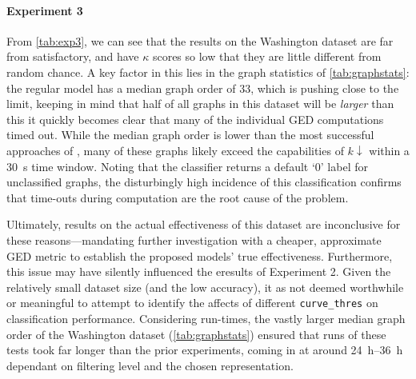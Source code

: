 \documentclass{mpaper}
\begin{document}
\paragraph{Experiment 3}
From \cref{tab:exp3}, we can see that the results on the Washington dataset are far from satisfactory, and have $\kappa$ scores so low that they are little different from random chance.
A key factor in this lies in the graph statistics of \cref{tab:graphstats}: the regular model has a median graph order of 33, which is pushing close to the limit, keeping in mind that half of all graphs in this dataset will be \emph{larger} than this it quickly becomes clear that many of the individual GED computations timed out.
While the median graph order is lower than the most successful approaches of \citeauthor{Graphs-Handwriting}, many of these graphs likely exceed the capabilities of $k\downarrow$ within a \SI{30}{\second} time window.
Noting that the classifier returns a default `0' label for unclassified graphs, the disturbingly high incidence of this classification confirms that time-outs during computation are the root cause of the problem.

Ultimately, results on the actual effectiveness of this dataset are inconclusive for these reasons---mandating further investigation with a cheaper, approximate GED metric to establish the proposed models' true effectiveness.
Furthermore, this issue may have silently influenced the eresults of Experiment 2.
Given the relatively small dataset size (and the low accuracy), it as not deemed worthwhile or meaningful to attempt to identify the affects of different \texttt{curve\_thres} on classification performance.
Considering run-times, the vastly larger median graph order of the Washington dataset (\cref{tab:graphstats}) ensured that runs of these tests took far longer than the prior experiments, coming in at around \SIrange{24}{36}{\hour} dependant on filtering level and the chosen representation.
\end{document}
